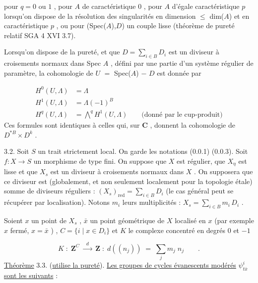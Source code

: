 pour  $q = 0$ ou $1$ , pour  $A$  de caractéristique  $0$ , pour  $A$  d'égale caractéristique  $p$  lorsqu'on dispose de la résolution des singularités en dimension $\leqslant$ dim($A$)  et en caractéristique  $p$ , ou pour  (Spec($A$),$D$)  un couple lisse (théorème de pureté relatif  SGA 4 XVI 3.7).

Lorsqu'on dispose de la pureté, et que  $D = \sum\limits_{i \in B} D_{i}$  est un diviseur à croisements normaux dans  Spec $A$ , défini par une partie d'un système régulier de paramètre, la cohomologie de  $U$ $=$ Spec($A$) $-$ $D$  est donnée par



\begin{equation}\tag{3.1.2}
\begin{aligned} H^{0}(U,\Lambda) &= \Lambda \\[4pt] H^{1}(U,\Lambda) &= \Lambda(-1)^{B} \\[4pt] H^{q}(U,\Lambda) &= \overset{q}{\bigwedge} H^{1}(U,\Lambda) \qquad \text{(donné par le cup-produit)} \end{aligned}
\end{equation}
Ces formules sont identiques à celles qui, sur  $\mathbf{C}$ , donnent la cohomologie de $D^{*B} \times D^{k}$ .

3.2. Soit  $S$  un trait strictement local. On garde les notations (0.0.1) (0.0.3). Soit  $f : X \longrightarrow S$  un morphisme de type fini. On suppose que  $X$  est régulier, que  $X_{\eta}$  est lisse et que  $X_{s}$  est un diviseur à croisements normaux dans  $X$ . On supposera que ce diviseur est (globalement, et non seulement localement pour la topologie étale) somme de diviseurs réguliers : $(X_{s})_{\mathrm{red}} = \sum\limits_{i \in B} D_{i}$  (le cas général peut se récupérer par localisation). Notons  $m_{i}$  leurs multiplicités : $X_{s} = \sum\limits_{i \in B} m_{i}\, D_{i}$ .

Soient  $x$  un point de  $X_{s}$ , $\bar{x}$  un point géométrique de  $X$  localisé en  $x$  (par exemple  $x$  fermé,  $x = \bar{x}$ ) ,  $C = \{i \mid x \in D_{i}\}$  et  $K$  le complexe concentré en degrés  $0$  et  $-1$

\begin{equation*}
K \;:\; \mathbf{Z}^{C} \;\xrightarrow{\;\;d\;\;}\; \mathbf{Z} \;:\; d((n_{j})) \;=\; \sum\limits_{j} m_{j}\; n_{j} \qquad .
\end{equation*}
\underline{Théorème} 3.3. (\underline{utilise la pureté}). \underline{Les groupes de cycles évanescents modérés} $\psi^{i}_{t\bar{x}}$ \underline{sont les suivants} :

